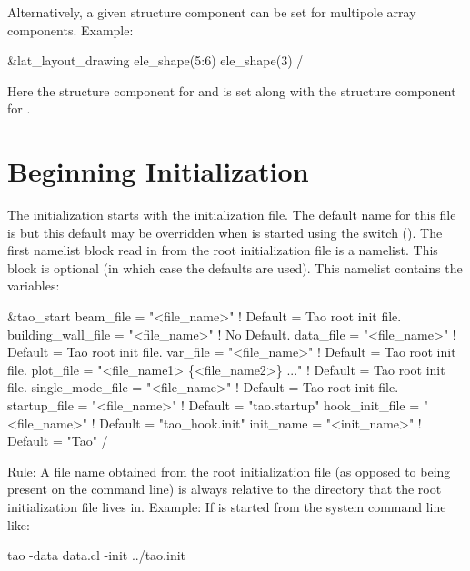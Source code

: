 Alternatively, a given structure component can be set for multipole array components. Example:
\begin{example}
  &lat_layout_drawing
    ele_shape(5:6)%
    ele_shape(3)%
  /
\end{example}
Here the  structure component for  and  is set along
with the  structure component for .

\section{Beginning Initialization}
\label{s:init.global} 

The initialization starts with the  \tao initialization file. The default name for this
file is  but this default may be overridden when \tao is started using the 
switch (). The first namelist block read in from the root initialization file is a
 namelist. This block is optional (in which case the defaults are used).  This
namelist contains the variables:
\begin{example}
  &tao_start
    beam_file          = "<file_name>"  ! Default = Tao root init file.
    building_wall_file = "<file_name>"  ! No Default.
    data_file          = "<file_name>"  ! Default = Tao root init file.
    var_file           = "<file_name>"  ! Default = Tao root init file.
    plot_file          = "<file_name1> \{<file_name2>\} ..."  
                                        ! Default = Tao root init file.
    single_mode_file   = "<file_name>"  ! Default = Tao root init file.
    startup_file       = "<file_name>"  ! Default = "tao.startup"
    hook_init_file     = "<file_name>"  ! Default = "tao_hook.init"
    init_name          = "<init_name>"  ! Default = "Tao"
  /
\end{example}
Rule: A file name obtained from the \tao root initialization file (as opposed to being present on
the command line) is always relative to the directory that the \tao root initialization file lives
in. Example: If \tao is started from the system command line like:
\begin{example}
    tao -data data.cl -init ../tao.init
\end{example}
